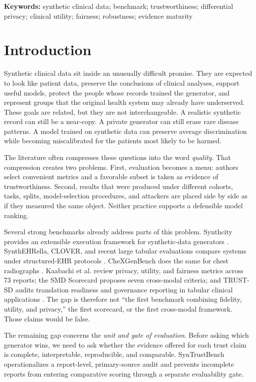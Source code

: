 \documentclass[11pt,letterpaper]{article}
\begin{document}
\textbf{Keywords:} synthetic clinical data; benchmark; trustworthiness; differential privacy; clinical utility; fairness; robustness; evidence maturity

\section{Introduction}

Synthetic clinical data sit inside an unusually difficult promise. They are expected to look like patient data, preserve the conclusions of clinical analyses, support useful models, protect the people whose records trained the generator, and represent groups that the original health system may already have underserved. These goals are related, but they are not interchangeable. A realistic synthetic record can still be a near-copy. A private generator can still erase rare disease patterns. A model trained on synthetic data can preserve average discrimination while becoming miscalibrated for the patients most likely to be harmed.

The literature often compresses these questions into the word \emph{quality}. That compression creates two problems. First, evaluation becomes a menu: authors select convenient metrics and a favorable subset is taken as evidence of trustworthiness. Second, results that were produced under different cohorts, tasks, splits, model-selection procedures, and attackers are placed side by side as if they measured the same object. Neither practice supports a defensible model ranking.

Several strong benchmarks already address parts of this problem. Synthcity provides an extensible execution framework for synthetic-data generators \citep{qian2023synthcity}. SynthEHRella, CLOVER, and recent large tabular evaluations compare systems under structured-EHR protocols \citep{chen2025synthehrella,qi2026clover,nanevski2026quality}. CheXGenBench does the same for chest radiographs \citep{dutt2026chexgenbench}. Kaabachi et al. review privacy, utility, and fairness metrics across 73 reports; the SMD Scorecard proposes seven cross-modal criteria; and TRUST-SD audits translation readiness and governance reporting in tabular clinical applications \citep{kaabachi2025privacyutility,zamzmi2025scorecard,castagno2026trustsd}. The gap is therefore not ``the first benchmark combining fidelity, utility, and privacy,'' the first scorecard, or the first cross-modal framework. Those claims would be false.

The remaining gap concerns the \emph{unit and gate of evaluation}. Before asking which generator wins, we need to ask whether the evidence offered for each trust claim is complete, interpretable, reproducible, and comparable. SynTrustBench operationalizes a report-level, primary-source audit and prevents incomplete reports from entering comparative scoring through a separate evaluability gate.
\end{document}

